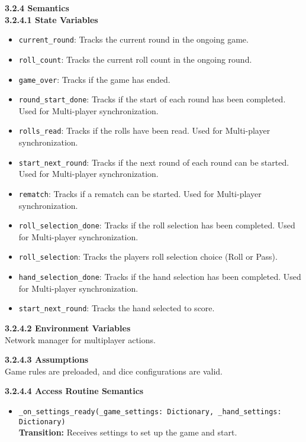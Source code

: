 \documentclass[12pt, titlepage]{article}
\begin{document}
\textbf{3.2.4 Semantics}\\
\textbf{3.2.4.1 State Variables}\\
\begin{itemize}
    \item \texttt{current\_round}: Tracks the current round in the ongoing game.
    \item \texttt{roll\_count}: Tracks the current roll count in the ongoing round.
    \item \texttt{game\_over}: Tracks if the game has ended.
    \item \texttt{round\_start\_done}: Tracks if the start of each round has been completed. Used for Multi-player synchronization.
    \item \texttt{rolls\_read}: Tracks if the rolls have been read. Used for Multi-player synchronization.
    \item \texttt{start\_next\_round}: Tracks if the next round of each round can be started. Used for Multi-player synchronization.
    \item \texttt{rematch}: Tracks if a rematch can be started. Used for Multi-player synchronization.
    \item \texttt{roll\_selection\_done}: Tracks if the roll selection has been completed. Used for Multi-player synchronization.
    \item \texttt{roll\_selection}: Tracks the players roll selection choice (Roll or Pass).
    \item \texttt{hand\_selection\_done}: Tracks if the hand selection has been completed. Used for Multi-player synchronization.
    \item \texttt{start\_next\_round}: Tracks the hand selected to score.
\end{itemize}

\textbf{3.2.4.2 Environment Variables}\\
Network manager for multiplayer actions.

\textbf{3.2.4.3 Assumptions}\\
Game rules are preloaded, and dice configurations are valid.

\textbf{3.2.4.4 Access Routine Semantics}
\begin{itemize}
    \item \texttt{\_on\_settings\_ready(\_game\_settings: Dictionary, \_hand\_settings: Dictionary)}\\
    \textbf{Transition:} Receives settings to set up the game and start.
\end{itemize}
\end{document}
